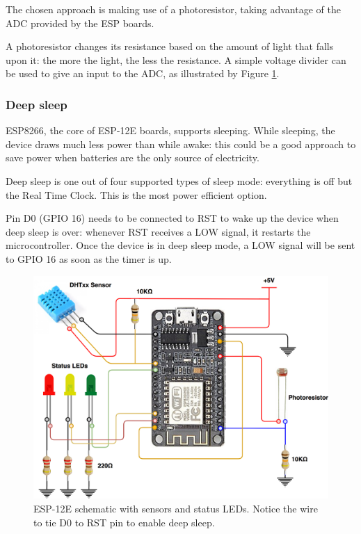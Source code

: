 The chosen approach is making use of a photoresistor, taking advantage of the ADC provided by the ESP boards.

A photoresistor changes its resistance based on the amount of light that falls upon it: the more the light, the less the resistance. A simple voltage divider can be used to give an input to the ADC, as illustrated by Figure \ref{esp12_wiring}.

\subsubsection{Deep sleep}
ESP8266, the core of ESP-12E boards, supports sleeping. While sleeping, the device draws much less power than while awake: this could be a good approach to save power when batteries are the only source of electricity.

Deep sleep is one out of four supported types of sleep mode: everything is off but the Real Time Clock. This is the most power efficient option.

Pin D0 (GPIO 16) needs to be connected to RST to wake up the device when deep sleep is over: whenever RST receives a LOW signal, it restarts the microcontroller. Once the device is in deep sleep mode, a LOW signal will be sent to GPIO 16 as soon as the timer is up.

\begin{figure}[H]
	\begin{center}
		\includegraphics[width=\textwidth]{./pictures/ESP-12E_wiring.png}
		\caption{ESP-12E schematic with sensors and status LEDs. Notice the wire to tie D0 to RST pin to enable deep sleep.}
		\label{esp12_wiring}
	\end{center}
\end{figure}

